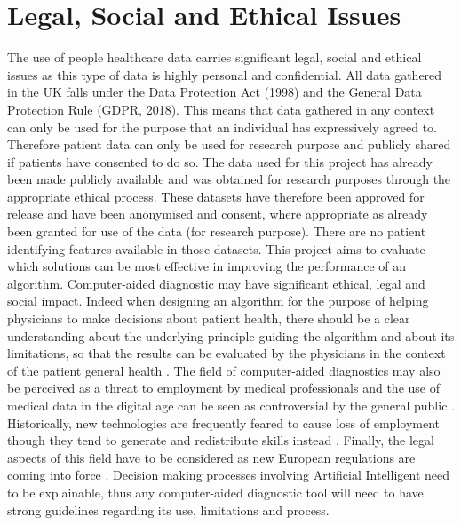\section{Legal, Social and Ethical Issues}
The use of people healthcare data carries significant legal, social and ethical issues as this type of data is highly personal and confidential. 
All data gathered in the UK falls under the Data Protection Act (1998) and the General Data Protection Rule (GDPR, 2018). This means that data gathered in any context can only be used for the purpose that an individual has expressively agreed to. Therefore patient data can only be used for research purpose and publicly shared if patients have consented to do so.\newline
The data used for this project has already been made publicly available and was obtained for research purposes through the appropriate ethical process. These datasets have therefore been approved for release and have been anonymised and consent, where appropriate as already been granted for use of the data (for research purpose).\newline
There are no patient identifying features available in those datasets.\newline
This project aims to evaluate which solutions can be most effective in improving the performance of an algorithm. Computer-aided diagnostic may have significant ethical, legal and social impact. Indeed when designing an algorithm for the purpose of helping physicians to make decisions about patient health, there should be a clear understanding about the underlying principle guiding the algorithm and about its limitations, so that the results can be evaluated by the physicians in the context of the patient general health \citep{Ahmad:2018fz}.\newline
The field of computer-aided diagnostics may also be perceived as a threat to employment by medical professionals \citep{Pesapane:2018kv, Cabitza:2017hv} and the use of medical data in the digital age can be seen as controversial by the general public \citep{Goldacre:tf}. Historically, new technologies are frequently feared to cause loss of employment though they tend to generate and redistribute skills instead \citep{Allen:2015ww}.\newline
Finally, the legal aspects of this field have to be considered as new European regulations are coming into force \citep{Parliament:TIo8Z78P}. Decision making processes involving Artificial Intelligent need to be explainable, thus any computer-aided diagnostic tool will  need to have strong guidelines regarding its use, limitations and process.

